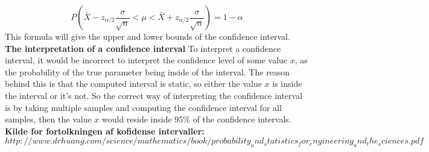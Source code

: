 $$P(\bar{X}-z_{\alpha/2}\frac{\sigma}{\sqrt{n}}<\mu<\bar{X}+z_{\alpha/2}\frac{\sigma}{\sqrt{n}})=1-\alpha$$
\newline
This formula will give the upper and lower bounds of the confidence interval.\\

\noindent \textbf{The interpretation of a confidence interval}
\newline
To interpret a confidence interval, it would be incorrect to interpret the confidence level of some value $x$, as the probability of the true parameter being inside of the interval. The reason behind this is that the computed interval is static, so either the value $x$ is inside the interval or it's not. So the correct way of interpreting the confidence interval is by taking multiple samples and computing the confidence interval for all samples, then the value $x$ would reside inside 95\% of the confidence intervals.
\textbf{Kilde for fortolkningen af kofidense intervaller:}
\newline
$http://www.drhuang.com/science/mathematics/book/probability_and_statistics_for_engineering_and_the_sciences.pdf$



